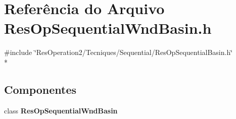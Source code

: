 \section{Referência do Arquivo Res\+Op\+Sequential\+Wnd\+Basin.\+h}
\label{_res_op_sequential_wnd_basin_8h}
{\ttfamily \#include \char`\"{}Res\+Operation2/\+Tecniques/\+Sequential/\+Res\+Op\+Sequential\+Basin.\+h\char`\"{}}\\*
\subsection*{Componentes}
\begin{DoxyCompactItemize}
\item 
class {\bf Res\+Op\+Sequential\+Wnd\+Basin}
\end{DoxyCompactItemize}
